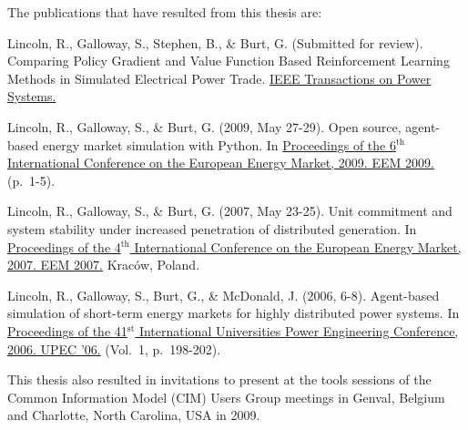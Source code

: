The publications that have resulted from this thesis are:

\vspace{1pc}
Lincoln, R., Galloway, S., Stephen, B., \& Burt, G. (Submitted for review).
Comparing Policy Gradient and Value Function Based Reinforcement
Learning Methods in Simulated Electrical Power Trade.
\ul{IEEE Transactions on Power Systems.}

\vspace{1pc}
Lincoln, R., Galloway, S., \& Burt, G. (2009, May 27-29). Open source,
agent-based energy market simulation with Python. In \ul{Proceedings of
the 6$^{\textrm{th}}$ International Conference on the European Energy Market,
2009. EEM 2009.} (p.~1-5).

\vspace{1pc}
Lincoln, R., Galloway, S., \& Burt, G. (2007, May 23-25). Unit
commitment and system stability under increased penetration of distributed
generation. In \ul{Proceedings of the 4$^{\textrm{th}}$ International Conference
on the European Energy Market, 2007. EEM 2007.} Krac\'ow, Poland.

\vspace{1pc}
Lincoln, R., Galloway, S., Burt, G., \& McDonald, J. (2006, 6-8).
Agent-based simulation of short-term energy markets for highly distributed
power systems. In \ul{Proceedings of the 41$^{\textrm{st}}$ International
Universities Power Engineering Conference, 2006. UPEC '06.} (Vol.~1,
p.~198-202).

\vspace{1pc}
This thesis also resulted in invitations to present at the tools sessions of the
Common Information Model (CIM) Users Group meetings in Genval, Belgium and
Charlotte, North Carolina, USA in 2009.


